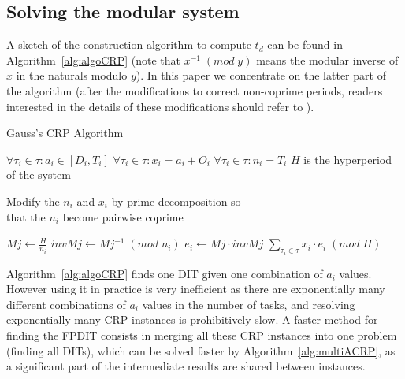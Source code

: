 \documentclass[conference]{IEEEtran}
\begin{document}
	\subsection{Solving the modular system}
		A sketch of the construction algorithm to compute $t_d$ can be found in
		Algorithm~\ref{alg:algoCRP} (note that $x^{-1} \; (mod \; y)$ means the
		modular inverse of $x$ in the naturals modulo $y$). In this paper we
		concentrate on the latter part of the algorithm (after the modifications to
		correct non-coprime periods, readers interested in the details of these
		modifications should refer to \cite{knuth1969art}).
		\begin{algorithm}
			\caption{Gauss's CRP Algorithm}
			\label{alg:algoCRP}
			\begin{algorithmic}[1]
				\REQUIRE $\forall \tau_i \in \tau : a_i \in [D_i,T_i]$
				\REQUIRE $\forall \tau_i \in \tau : x_i = a_i+O_i$
				\REQUIRE $\forall \tau_i \in \tau : n_i = T_i$
				\REQUIRE $H$ is the hyperperiod of the system

				\STATE Modify the $n_i$ and $x_i$ by prime decomposition so \\ that the
				$n_i$ become pairwise coprime

					\STATE $Mj \leftarrow \frac{H}{n_i}$
					\STATE $invMj \leftarrow Mj^{-1} \; (mod \; n_i)$
					\STATE $e_i \leftarrow Mj \cdot invMj$
				\ENDFOR
				\RETURN $\sum\limits_{\tau_i \in \tau}{x_i \cdot e_i} \; (mod \; H)$
			\end{algorithmic}
		\end{algorithm}
		Algorithm~\ref{alg:algoCRP} finds one DIT given one combination of $a_i$
		values. However using it in practice is very inefficient as there are
		exponentially many different combinations of $a_i$ values in the number of
		tasks, and resolving exponentially many CRP instances is prohibitively slow.
		A faster method for finding the FPDIT consists in merging all these CRP
		instances into one problem (finding all DITs), which can be solved faster by
		Algorithm~\ref{alg:multiACRP}, as a significant part of the intermediate
		results are shared between instances.

\end{document}
